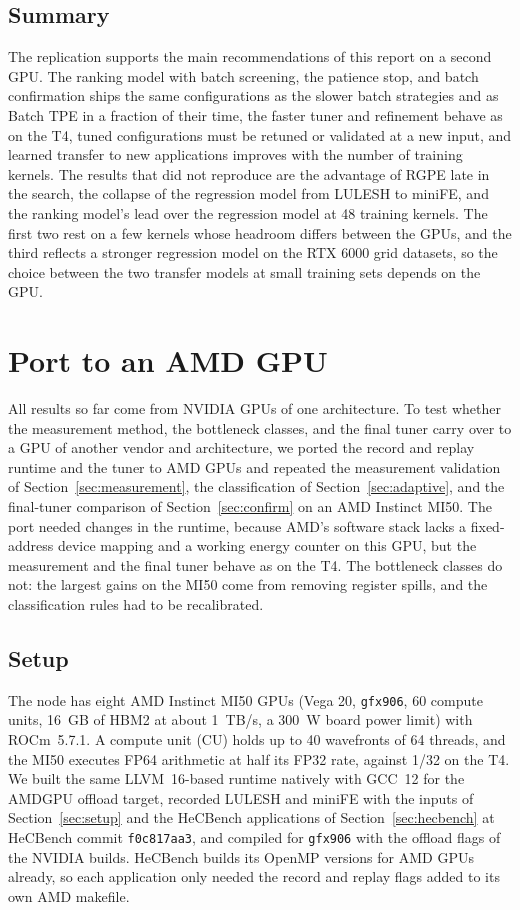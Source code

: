 \documentclass[10pt]{article}
\newcommand{\code}[1]{\texttt{#1}}
\begin{document}
\subsection{Summary}
The replication supports the main recommendations of this report on a second
GPU. The ranking model with batch screening, the patience stop, and batch
confirmation ships the same configurations as the slower batch strategies and
as Batch TPE in a fraction of their time, the faster tuner and refinement
behave as on the T4, tuned configurations must be retuned or validated at a
new input, and learned transfer to new applications improves with the number
of training kernels. The results that did not reproduce are the advantage of
RGPE late in the search, the collapse of the regression model from LULESH to
miniFE, and the ranking model's lead over the regression model at 48 training
kernels. The first two rest on a few kernels whose headroom differs between
the GPUs, and the third reflects a stronger regression model on the RTX 6000
grid datasets, so the choice between the two transfer models at small training
sets depends on the GPU.


\section{Port to an AMD GPU}
\label{sec:amd}
All results so far come from NVIDIA GPUs of one architecture. To test whether
the measurement method, the bottleneck classes, and the final tuner carry over
to a GPU of another vendor and architecture, we ported the record and replay
runtime and the tuner to AMD GPUs and repeated the measurement validation of
Section~\ref{sec:measurement}, the classification of Section~\ref{sec:adaptive},
and the final-tuner comparison of Section~\ref{sec:confirm} on an AMD Instinct
MI50. The port needed changes in the runtime, because AMD's software stack lacks
a fixed-address device mapping and a working energy counter on this GPU, but the
measurement and the final tuner behave as on the T4. The bottleneck classes do
not: the largest gains on the MI50 come from removing register spills, and the
classification rules had to be recalibrated.

\subsection{Setup}
\label{sec:amd-setup}
The node has eight AMD Instinct MI50 GPUs (Vega 20, \code{gfx906}, 60 compute
units, 16~GB of HBM2 at about 1~TB/s, a 300~W board power limit) with ROCm~5.7.1.
A compute unit (CU) holds up to 40 wavefronts of 64 threads, and the MI50
executes FP64 arithmetic at half its FP32 rate, against 1/32 on the T4. We built
the same LLVM~16-based runtime natively with GCC~12 for the AMDGPU offload
target, recorded LULESH and miniFE with the inputs of
Section~\ref{sec:setup} and the HeCBench applications of
Section~\ref{sec:hecbench} at HeCBench commit \code{f0c817aa3}, and compiled for
\code{gfx906} with the offload flags of the NVIDIA builds. HeCBench builds its
OpenMP versions for AMD GPUs already, so each application only needed the
record and replay flags added to its own AMD makefile.
\end{document}
